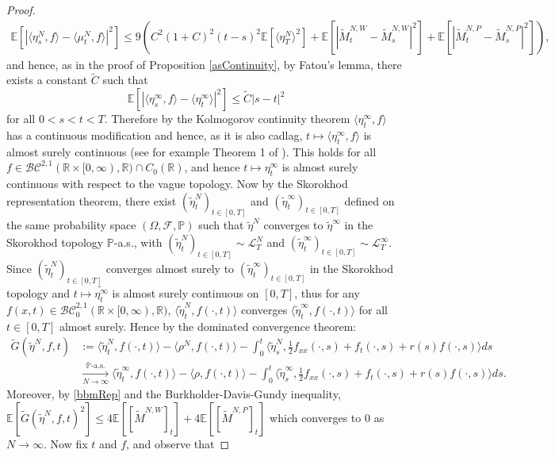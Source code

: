 \documentclass{article}
\newcommand{\B}[1]{\mathbb{#1}}
\newcommand{\C}[1]{\mathcal{#1}}
\begin{document}
\begin{proof}
    \begin{align*}\B{E}[|\langle \eta^N_s,f\rangle-\langle \mu_t^N,f\rangle|^2]\leq 9(C^2(1+C)^2(t-s)^2\B{E}[\langle \eta_T^N\rangle^2]+\B{E}[|\tilde{M}^{N,W}_t-\tilde{M}^{N,W}_s|^2]+\B{E}[|\tilde{M}^{N,P}_t-\tilde{M}^{N,P}_s|^2]),\end{align*}
    and hence, as in the proof of Proposition \ref{asContinuity}, by Fatou's lemma, there exists a constant $\tilde{C}$ such that $$\B{E}[|\langle \eta_s^\infty,f\rangle - \langle \eta_t^\infty\rangle|^2]\leq \tilde{C}|s-t|^2$$ for all $0<s<t<T$. Therefore by the Kolmogorov continuity theorem $\langle \eta_t^\infty,f\rangle$ has a continuous modification and hence, as it is also cadlag, $t\mapsto \langle \eta_t^\infty,f\rangle$ is almost surely continuous (see for example Theorem 1 of \cite{schilling}). This holds for all $f\in \C{BC}^{2,1}(\B{R}\times [0,\infty),\B{R})\cap C_0(\B{R})$, and hence $t\mapsto \eta_t^\infty$ is almost surely continuous with respect to the vague topology. Now by the Skorokhod representation theorem, there exist $(\tilde{\eta}^N_t)_{t\in [0,T]}$ and $(\tilde{\eta}^\infty_t)_{t\in [0,T]}$ defined on the same probability space $(\Omega,\C{F},\B{P})$ such that $\tilde{\eta}^N$ converges to $\tilde{\eta}^\infty$ in the Skorokhod topology $\B{P}$-a.s., with $(\tilde{\eta}^N_t)_{t\in [0,T]}\sim \C{L}^N_T$ and $(\tilde{\eta}^\infty_t)_{t\in [0,T]}\sim \C{L}^\infty_T$. Since $(\tilde{\eta}^N_t)_{t\in [0,T]}$ converges almost surely to $(\tilde{\eta}^\infty_t)_{t\in [0,T]}$ in the Skorokhod topology and $t\mapsto \tilde{\eta^\infty_t}$ is almost surely continuous on $[0,T]$, thus for any $f(x,t)\in \C{BC}_0^{2,1}(\B{R}\times [0,\infty),\B{R})$, $\langle \tilde{\eta}^N_t,f(\cdot,t)\rangle$ converges $\langle \tilde{\eta}^\infty_t,f(\cdot,t)\rangle$ for all $t\in [0,T]$ almost surely. Hence by the dominated convergence theorem:
    \begin{align*}
        \tilde{G}(\tilde{\eta}^N,f,t)&:=\langle \tilde{\eta}_t^N,f(\cdot,t)\rangle - \langle \rho^N,f(\cdot,t)\rangle - \int_0^t \langle \tilde{\eta}_s^N,\frac12 f_{xx}(\cdot,s)+f_t(\cdot,s)+r(s)f(\cdot,s)\rangle ds \\
        &\xrightarrow[N\to\infty]{\B{P}\text{-a.s.}}\langle \tilde{\eta}_t^\infty,f(\cdot,t)\rangle -\langle \rho,f(\cdot,t)\rangle - \int_0^t \langle \tilde{\eta}^\infty_s,\frac12 f_{xx}(\cdot,s)+f_t(\cdot,s)+r(s)f(\cdot,s)\rangle ds.
    \end{align*}
    Moreover, by \eqref{bbmRep} and the Burkholder-Davis-Gundy inequality, $\B{E}[\tilde{G}(\tilde{\eta}^N,f,t)^2] \leq 4\B{E}[[\tilde{M}^{N,W}]_t]+4\B{E}[[\tilde{M}^{N,P}]_t]$ which converges to $0$ as $N\to\infty$. Now fix $t$ and $f$, and observe that 

\end{proof}
\end{document}
